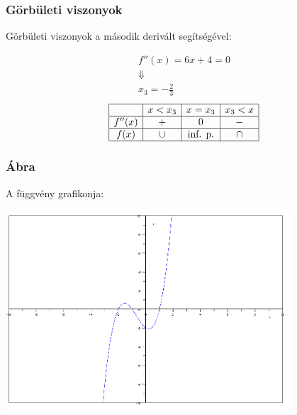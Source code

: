 \documentclass[ignorenonframetext]{beamer}
\begin{document}
\begin{frame}[fragile]
\frametitle{Görbületi viszonyok}
Görbületi viszonyok a második derivált segítségével:


                    \begin{gather*}
                        f''(x)=6x+4=0\\
                        \Downarrow\\
                        x_3=-\frac{2}{3}
                    \end{gather*}
                    \[
                        \begin{array}{|c|c|c|c|}
                            \hline
                                   & x<x_3 & x=x_3          & x_3<x \\
                            \hline
                            f''(x) & +     & 0              & -     \\
                            \hline
                            f(x)   & \cup  & \text{inf. p.} & \cap  \\
                            \hline
                        \end{array}
                    \]

\end{frame}
\begin{frame}[fragile]
\frametitle{Ábra}
A függvény grafikonja:
\\
\begin{center}
    \includegraphics[width=0.8\textwidth]{03_pic04_1}
\end{center}

\end{frame}
\end{document}
